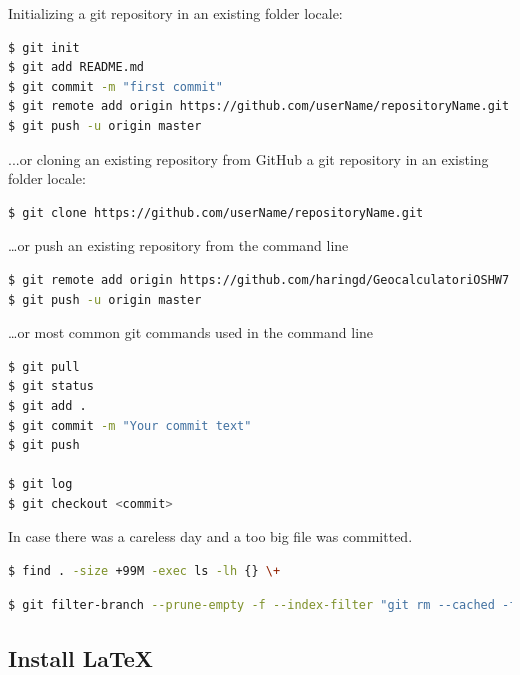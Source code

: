 Initializing a git repository in an existing folder locale:
\begin{lstlisting}[language=bash,caption={Initializing a git repository},label=lst: git init]
$ git init
$ git add README.md
$ git commit -m "first commit"
$ git remote add origin https://github.com/userName/repositoryName.git
$ git push -u origin master
\end{lstlisting}
...or cloning an existing repository from GitHub a git repository in an existing folder locale:
\begin{lstlisting}[language=bash,caption={Clone git repository},label=lst: git clone]
$ git clone https://github.com/userName/repositoryName.git
\end{lstlisting}
…or push an existing repository from the command line
\begin{lstlisting}[language=bash,caption={Remote git repository on GitHub},label=lst: git remote]
$ git remote add origin https://github.com/haringd/GeocalculatoriOSHW7.git
$ git push -u origin master
\end{lstlisting}
…or most common git commands used in the command line
\begin{lstlisting}[language=bash,caption={git common commands},label=lst:git common]
$ git pull
$ git status
$ git add .
$ git commit -m "Your commit text"
$ git push

$ git log
$ git checkout <commit>
\end{lstlisting}

In case there was a careless day and a too big file was committed.
\begin{lstlisting}[language=bash,caption={git bash find files larger then 99MB},label=lst:git common]
$ find . -size +99M -exec ls -lh {} \+
\end{lstlisting}
\begin{lstlisting}[language=bash,caption={git delete files from history which are larger then 99MB},label=lst:git common]
$ git filter-branch --prune-empty -f --index-filter "git rm --cached -f --ignore-unmatch Project2015/simulations/LTC3878_EMC_Project_v2.raw"           
\end{lstlisting}



\subsection{Install \LaTeX}\label{subsec: install_latex}
